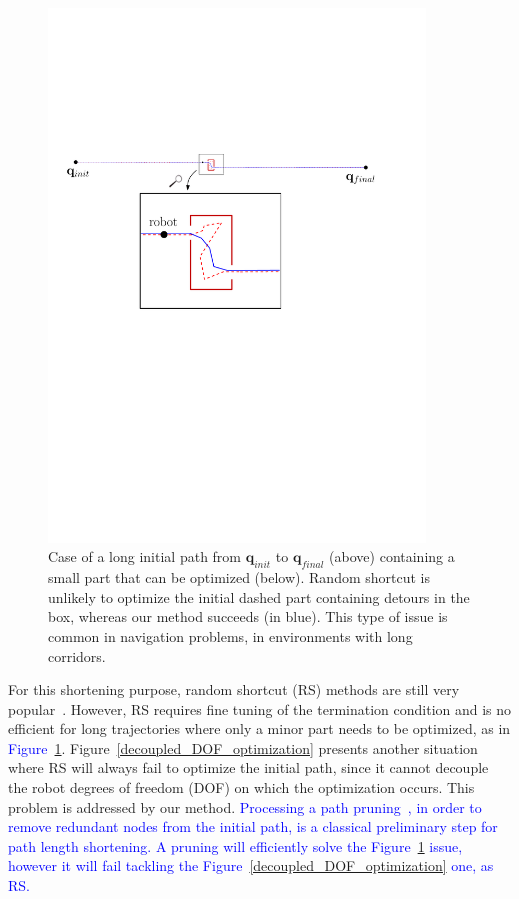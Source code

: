 \documentclass{tADR2e}
\newcommand\conf{\mathbf{q}}
\begin{document}
\begin{figure}
	\centering
	\includegraphics[width=10cm]{local_box_optim2.pdf}
	\caption{Case of a long initial path from $\conf_{init}$ to $\conf_{final}$ (above) containing a small part 
	that can 
	be optimized (below). Random shortcut is unlikely to optimize the initial 
	dashed part containing detours in the box, whereas our method 
	succeeds (in blue). This type of issue is common in navigation problems, in 
	environments with long corridors.}
	\label{local_box_optim}
\end{figure}

For this shortening purpose, random shortcut (RS) methods are
still very 
popular~\cite{Sekhavat-Svestka1998,GeraertsIJRR07,HauserFastSmooth}. 
However, RS requires fine 
tuning of the termination condition and is no efficient for long 
trajectories where only a minor part needs to be optimized, 
as in \textcolor{blue}{Figure~\ref{local_box_optim}}.
Figure~\ref{decoupled_DOF_optimization} presents another situation where RS 
will always fail to optimize the initial path, since it cannot decouple the 
robot degrees of freedom (DOF) on which the optimization occurs. This problem is 
addressed by our method.
\textcolor{blue}{Processing a path 
pruning~\cite{GeraertsIJRR07}, in order to remove redundant nodes from the initial 
path, is a classical preliminary step for path length shortening. 
A pruning will efficiently solve the Figure~\ref{local_box_optim} issue, however it 
will fail tackling the Figure~\ref{decoupled_DOF_optimization} one, as RS.}
\end{document}
